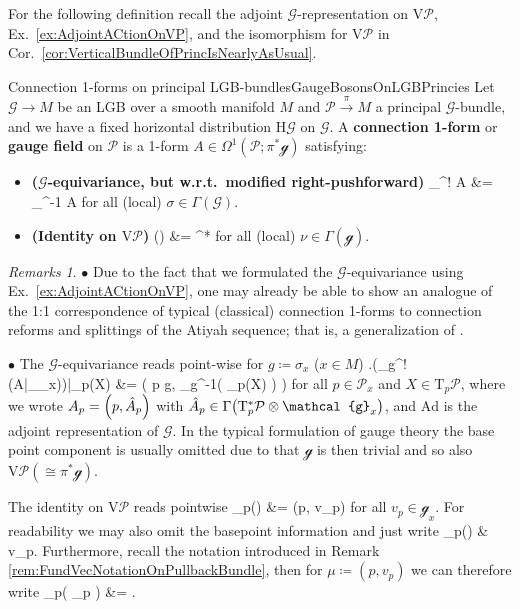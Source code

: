 \documentclass[a4paper,oneside,11pt,bibliography=totoc]{scrartcl}
\DeclareMathOperator{\sAd}{\mathKel{A\mkern-5.5mu d}}
\def\bas#1\eas{\begin{align*}#1\end{align*}}
\theoremstyle{plain}
\theoremstyle{remark}
\newtheorem{remark}[theorem]{Remarks}
\theoremstyle{definition}
\begin{document}
For the following definition recall the adjoint $\mathcal{G}$-representation on $\mathrm{V}\mathcal{P}$, Ex.\ \ref{ex:AdjointACtionOnVP}, and the isomorphism for $\mathrm{V}\mathcal{P}$ in Cor.\ \ref{cor:VerticalBundleOfPrincIsNearlyAsUsual}.

\begin{definitions}{Connection 1-forms on principal LGB-bundles}{GaugeBosonsOnLGBPrincies}
Let $\mathcal{G} \to M$ be an LGB over a smooth manifold $M$ and $\mathcal{P} \stackrel{\pi}{\to} M$ a principal $\mathcal{G}$-bundle, and we have a fixed horizontal distribution $\mathrm{H}\mathcal{G}$ on $\mathcal{G}$. A \textbf{connection 1-form} or \textbf{gauge field} on $\mathcal{P}$ is a 1-form $A \in \Omega^1(\mathcal{P}; \pi^*\mathcal{g})$ satisfying:
\begin{itemize}
	\item \textbf{($\mathcal{G}$-equivariance, but w.r.t.\ modified right-pushforward)}
		\bas 
			\mathcal{r}_\sigma^! A
			&=
			\sAd_{\sigma^{-1}} \circ A
		\eas
	for all (local) $\sigma \in \Gamma(\mathcal{G})$.
	\item \textbf{(Identity on $\mathrm{V}\mathcal{P}$)}
	\bas
	A\mleft(\widetilde{\nu}\mright)
	&=
	\pi^*\nu
	\eas
	for all (local) $\nu \in \Gamma(\mathcal{g})$.
\end{itemize}
\end{definitions}

\begin{remark}\label{PointwiseNotationOfConnectioNOneForms}
\leavevmode\newline
\indent $\bullet$ Due to the fact that we formulated the $\mathcal{G}$-equivariance using Ex.\ \ref{ex:AdjointACtionOnVP}, one may already be able to show an analogue of the 1:1 correspondence of typical (classical) connection 1-forms to connection reforms and splittings of the Atiyah sequence; that is, a generalization of \cite[\S 3.2, page 90 ff.]{mackenzieGeneralTheory}.

$\bullet$ The $\mathcal{G}$-equivariance reads point-wise for $g \coloneqq \sigma_x$ ($x\in M$)
\bas
\mleft.\mleft(_g^! \mleft(A|_{_x}\mright)\mright)\mright|_{p}(X)
&=
\mleft(
	p \cdot g, 
	_{g^{-1}}\mleft( _p(X) \mright)
\mright)
\eas
for all $p \in \mathcal{P}_x$ and $X \in \mathrm{T}_p\mathcal{P}$,
where we wrote $A_p = \mleft(p, \hat{A}_p\mright)$ with $\hat{A}_p \in \Gamma\mleft( \mathrm{T}^*_p\mathcal{P} \otimes \mathcal{g}_x \mright)$, and $\mathrm{Ad}$ is the adjoint representation of $\mathcal{G}$. In the typical formulation of gauge theory the base point component is usually omitted due to that $\mathcal{g}$ is then trivial and so also $\mathrm{V}\mathcal{P} (\cong \pi^*\mathcal{g})$.

The identity on $\mathrm{V}\mathcal{P}$ reads pointwise
\bas
A_p()
&=
(p, v_p)
\eas
for all $v_p \in \mathcal{g}_x$. For readability we may also omit the basepoint information and just write
\bas
A_p()
&\equiv
v_p.
\eas
Furthermore, recall the notation introduced in Remark \ref{rem:FundVecNotationOnPullbackBundle}, then for $\mu \coloneqq (p, v_p)$ we can therefore write
\bas
A_p\mleft( \widetilde{\mu}_p \mright)
&=
\mu.
\eas
\end{remark}
\end{document}
